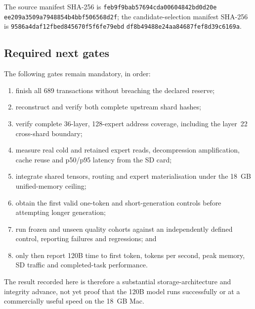 The source manifest SHA-256 is
\texttt{feb9f9bab57694cda00604842bd0d20e}%
\allowbreak\texttt{ee209a3509a7948854b4bbf506568d2f};
the candidate-selection manifest SHA-256 is
\texttt{9586a4daf12fbed845670f5f6fe79ebd}%
\allowbreak\texttt{df8b49488e24aa84687fef8d39c6169a}.

\subsection{Required next gates}

The following gates remain mandatory, in order:
\begin{enumerate}
  \item finish all 689 transactions without breaching the declared reserve;
  \item reconstruct and verify both complete upstream shard hashes;
  \item verify complete 36-layer, 128-expert address coverage, including the
        layer~22 cross-shard boundary;
  \item measure real cold and retained expert reads, decompression amplification,
        cache reuse and p50/p95 latency from the SD card;
  \item integrate shared tensors, routing and expert materialisation under the
        18~GB unified-memory ceiling;
  \item obtain the first valid one-token and short-generation controls before
        attempting longer generation;
  \item run frozen and unseen quality cohorts against an independently defined
        control, reporting failures and regressions; and
  \item only then report 120B time to first token, tokens per second, peak
        memory, SD traffic and completed-task performance.
\end{enumerate}

The result recorded here is therefore a substantial storage-architecture and
integrity advance, not yet proof that the 120B model runs successfully or at a
commercially useful speed on the 18~GB Mac.
\endgroup

